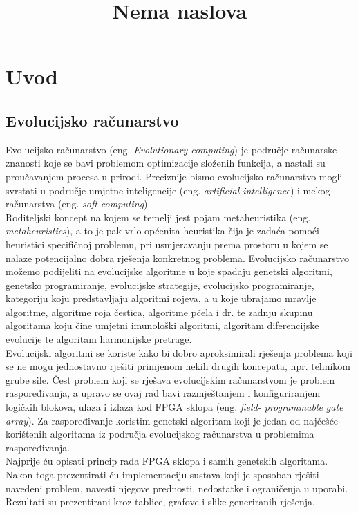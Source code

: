 \documentclass[times, utf8, zavrsni]{fer}
\begin{document}
	
	
	\title{Nema naslova}
	
	\zahvala{}
	
	\tableofcontents
	
	\chapter{Uvod}
	
	\section{Evolucijsko računarstvo}
	
	Evolucijsko računarstvo (eng. \emph{Evolutionary computing}) je područje računarske znanosti koje se bavi problemom optimizacije složenih funkcija, a nastali su proučavanjem procesa u prirodi. Preciznije bismo evolucijsko računarstvo mogli svrstati u područje umjetne inteligencije (eng. \emph{artificial intelligence}) i mekog računarstva (eng. \emph{soft computing}).\\Roditeljski koncept na kojem se temelji jest pojam metaheuristika (eng. \emph{metaheuristics}), a to je pak vrlo općenita heuristika čija je zadaća pomoći heuristici specifičnoj problemu, pri usmjeravanju prema prostoru u kojem se nalaze potencijalno dobra rješenja konkretnog problema. Evolucijsko računarstvo možemo podijeliti na evolucijske algoritme u koje spadaju genetski algoritmi, genetsko programiranje, evolucijske strategije, evolucijsko programiranje, kategoriju koju predstavljaju algoritmi rojeva, a u koje ubrajamo mravlje algoritme, algoritme roja čestica, algoritme pčela i dr. te zadnju skupinu algoritama koju čine umjetni imunološki algoritmi, algoritam diferencijske evolucije te algoritam harmonijske pretrage.\\
	Evolucijski algoritmi se koriste kako bi dobro aproksimirali rješenja problema koji se ne mogu jednostavno rješiti primjenom nekih drugih koncepata, npr. tehnikom grube sile. Čest problem koji se rješava evolucijskim računarstvom je problem raspoređivanja, a upravo se ovaj rad bavi razmještanjem i konfiguriranjem logičkih blokova, ulaza i izlaza kod FPGA sklopa (eng. \emph{field- programmable gate array}). Za raspoređivanje koristim genetski algoritam koji je jedan od najčešće korištenih algoritama iz područja evolucijskog računarstva u problemima raspoređivanja.\\
	Najprije ću opisati princip rada FPGA sklopa i samih genetskih algoritama. Nakon toga prezentirati ću implementaciju sustava koji je sposoban rješiti navedeni problem, navesti njegove prednosti, nedostatke i ograničenja u uporabi. Rezultati su prezentirani kroz tablice, grafove i slike generiranih rješenja. 
	
\end{document}
